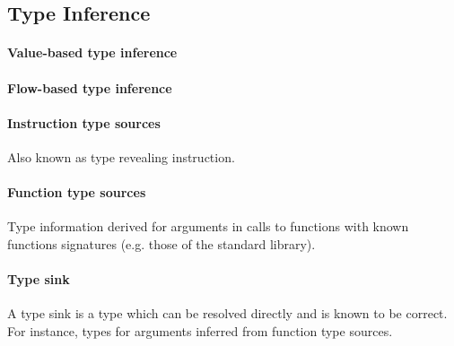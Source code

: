 
\subsection{Type Inference}


\paragraph{Value-based type inference}  \cite{type_inference_on_executables}


\paragraph{Flow-based type inference}

 \cite{milner_algorithmw}


\paragraph{Instruction type sources}

Also known as type revealing instruction.



\paragraph{Function type sources}

Type information derived for arguments in calls to functions with known functions signatures (e.g. those of the standard library). \cite{type_inference_on_executables}


\paragraph{Type sink}

A type sink is a type which can be resolved directly and is known to be correct. For instance, types for arguments inferred from function type sources.
